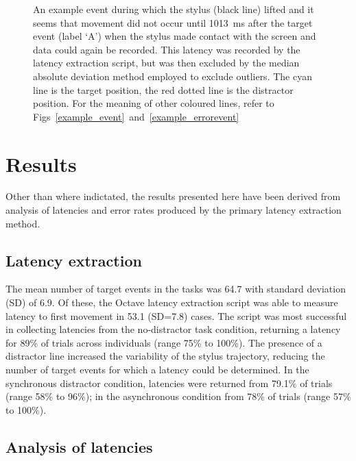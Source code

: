 \documentclass[10pt,letterpaper]{article}
\begin{document}
\begin{figure}[htb!]
\centering
\caption[Stylus lifted] {An example event during which the stylus
  (black line) lifted and it seems that movement did not occur until
  1013~ms after the target event (label `A') when the stylus made
  contact with the screen and data could again be recorded. This
  latency was recorded by the latency extraction script, but was then
  excluded by the median absolute deviation method employed to exclude
  outliers. The cyan line is the target position, the red dotted line
  is the distractor position. For the meaning of other coloured lines,
  refer to Figs~\ref{example_event}~and~\ref{example_errorevent}}
\label{stylus_lifted}
\end{figure}


\section*{Results}

Other than where indictated, the results presented here have been
derived from analysis of latencies and error rates produced by the
primary latency extraction method.

\subsection*{Latency extraction}

The mean number of target events in the tasks was 64.7 with standard
deviation (SD) of 6.9. Of these, the Octave latency extraction script
was able to measure latency to first movement in 53.1 (SD=7.8)
cases. The script was most successful in collecting latencies from the
no-distractor task condition, returning a latency for 89\% of trials
across individuals (range 75\% to 100\%). The presence of a distractor
line increased the variability of the stylus trajectory, reducing the
number of target events for which a latency could be determined. In
the synchronous distractor condition, latencies were returned from
79.1\% of trials (range 58\% to 96\%); in the asynchronous condition
from 78\% of trials (range 57\% to 100\%).

\subsection*{Analysis of latencies}
\end{document}

